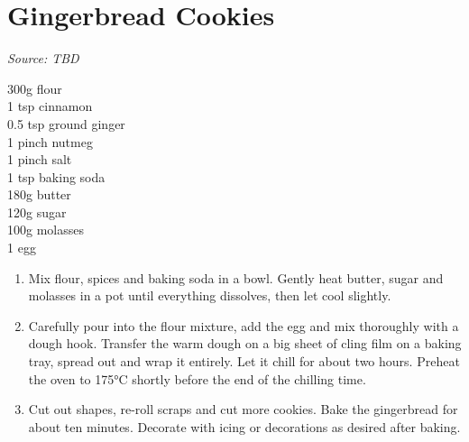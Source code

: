 \documentclass{report}
\begin{document}
\section{Gingerbread Cookies}
\textit{Source: TBD}\\
\begin{minipage}[t]{0.21\textwidth} \vspace{0pt} 
300g flour\\
1 tsp cinnamon\\
0.5 tsp ground ginger\\
1 pinch nutmeg\\
1 pinch salt\\
1 tsp baking soda\\
180g butter\\
120g sugar\\
100g molasses\\
1 egg
\end{minipage}
\hfill
\begin{minipage}[t]{0.78\textwidth} \vspace{0pt}
	\begin{enumerate}
		\item Mix flour, spices and baking soda in a bowl. Gently heat butter, sugar and molasses in a pot until everything dissolves, then let cool slightly.
		\item Carefully pour into the flour mixture, add the egg and mix thoroughly with a dough hook. Transfer the warm dough on a big sheet of cling film on a baking tray, spread out and wrap it entirely. Let it chill for about two hours. Preheat the oven to 175°C shortly before the end of the chilling time.
		\item Cut out shapes, re-roll scraps and cut more cookies. Bake the gingerbread for about ten minutes. Decorate with icing or decorations as desired after baking.
	\end{enumerate}	
\end{minipage}
\end{document}
